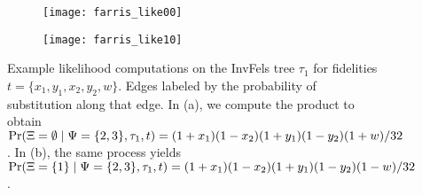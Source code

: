 \begin{figure}
\centering
\begin{subfigure}{.45\linewidth}
\centering
\texttt{[image: farris\_like00]}
\caption[short]{}
\end{subfigure}
\begin{subfigure}{.45\linewidth}
\centering
\texttt{[image: farris\_like10]}
\caption[short]{}
\end{subfigure}
\caption{
    Example likelihood computations on the InvFels tree $\tau_1$ for fidelities $t=\{x_1,y_1,x_2,y_2,w\}$.
    Edges labeled by the probability of substitution along that edge.
    In (a), we compute the product to obtain $\Pr(\Xi=\emptyset\mid \Psi=\{2,3\},\tau_1,t) = (1+x_1)(1-x_2)(1+y_1)(1-y_2)(1+w)/32$.
    In (b), the same process yields $\Pr(\Xi=\{1\}\mid \Psi=\{2,3\},\tau_1,t) = (1+x_1)(1-x_2)(1+y_1)(1-y_2)(1-w)/32$.
}
\label{fig:example_likelihoods}
\end{figure}

